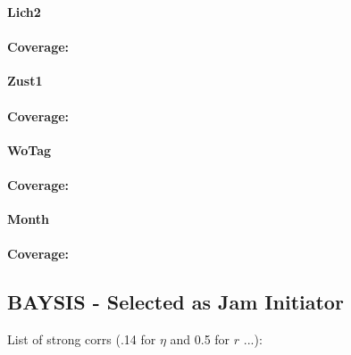 \begin{table}[ht]
\large
\centerline{\textbf{Lich2}}
\normalsize

\paragraph{Coverage:}

\large
\centerline{\textbf{Zust1}}
\normalsize

\paragraph{Coverage:}

\large
\centerline{\textbf{WoTag}}
\normalsize

\paragraph{Coverage:}

\large
\centerline{\textbf{Month}}
\normalsize

\paragraph{Coverage:}

\subsection{BAYSIS - Selected as Jam Initiator}

List of strong corrs (.14 for $\eta$ and 0.5 for $r$ ...):


\end{table}

